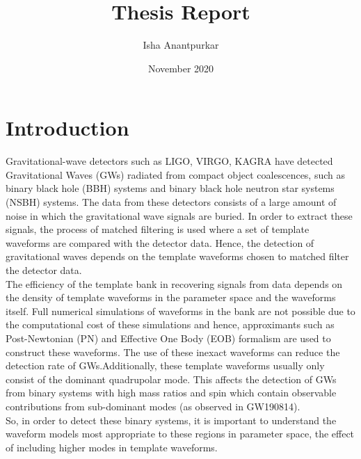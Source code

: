 \documentclass{article}
\title{Thesis Report}
\author{Isha Anantpurkar}
\date{November 2020}
\begin{document}
\maketitle

\section{Introduction}
Gravitational-wave detectors such as LIGO, VIRGO, KAGRA have detected Gravitational Waves (GWs) radiated from compact object coalescences, such as binary black hole (BBH) systems and binary black hole neutron star systems (NSBH) systems. The data from these detectors consists of a large amount of noise in which the gravitational wave signals are buried. In order to extract these signals, the process of matched filtering is used where a set of template waveforms are compared with the detector data. Hence, the detection of gravitational waves depends on the template waveforms chosen to matched filter the detector data. \\

The efficiency of the template bank in recovering signals from data depends on the density of template waveforms in the parameter space and the waveforms itself. Full numerical simulations of waveforms in the bank are not possible due to the computational cost of these simulations and hence, approximants such as Post-Newtonian (PN) and Effective One Body (EOB) formalism are used to construct these waveforms. The use of these inexact waveforms can reduce the detection rate of GWs.Additionally, these template waveforms usually only consist of the dominant quadrupolar mode. This affects the detection of GWs from binary systems with high mass ratios and spin which contain observable contributions from sub-dominant modes (as observed in GW190814). \\

So, in order to detect these binary systems, it is important to understand the waveform models most appropriate to these regions in parameter space, the effect of including higher modes in template waveforms. 
\end{document}
